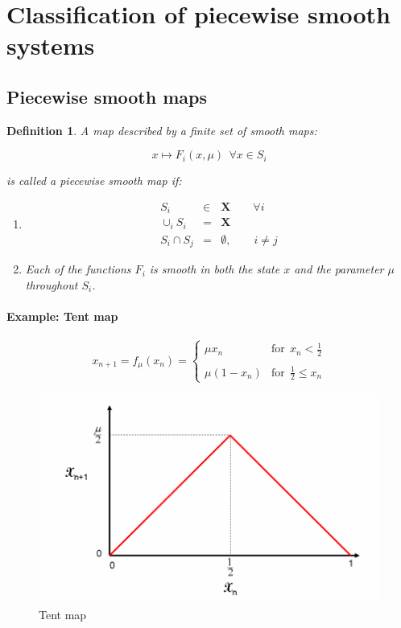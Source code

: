 \documentclass{book}
\renewcommand{\(}{\begin{columns}}
\renewcommand{\)}{\end{columns}}
\newcommand{\<}[1]{\begin{column}{#1}}
\renewcommand{\>}{\end{column}}
\newcommand{\para}{\paragraph}
\newtheorem{definition}{Definition}[section]
\begin{document}

\section{Classification of piecewise smooth systems}
\subsection{Piecewise smooth maps}

\begin{definition}
A map  described by a \emph{finite} set of \emph{smooth} maps:

\begin{equation}
\label{eq-pwmap}
x\mapsto F_i(x,\mu)~~\forall x\in S_i
\end{equation}

is called a piecewise smooth map if:

\begin{enumerate}
\item 
\begin{eqnarray*}
S_i&\in& \mathbf{X}\hspace{2em} \forall i\\
\cup_i S_i&=&\mathbf{X}\\
S_i\cap S_j&=&\emptyset, \hspace{2em} i\ne j
\end{eqnarray*}

\item Each of the functions $F_i$ is smooth in both the state $x$ and the parameter 
$\mu$ throughout $S_i$.  
\end{enumerate}
\end{definition}
\para{Example: Tent map}
\begin{equation}
\label{eq-tent}
x_{n+1}=f_\mu(x_n)=\begin{cases} \mu x_n & \mathrm{for}~~ x_n < \frac{1}{2} \\ \\ \mu (1-x_n) & \mathrm{for}~~ \frac{1}{2} \le x_n \end{cases}
\end{equation}


\begin{figure}[!htp]
\caption{Tent map}
\begin{center}
\includegraphics[width=0.7\columnwidth]{Tent_map}
\end{center}
\end{figure}
\end{document}

